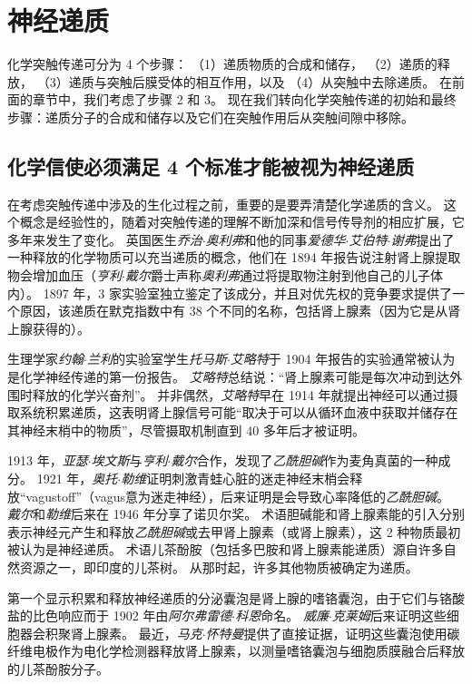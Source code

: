\chapter{神经递质} \label{chap:chap16}

化学突触传递可分为 4 个步骤：
（1）递质物质的合成和储存，
（2）递质的释放，
（3）递质与突触后膜受体的相互作用，以及
（4）从突触中去除递质。
在前面的章节中，我们考虑了步骤 2 和 3。
现在我们转向化学突触传递的初始和最终步骤：递质分子的合成和储存以及它们在突触作用后从突触间隙中移除。



\section{化学信使必须满足 4 个标准才能被视为神经递质}

在考虑突触传递中涉及的生化过程之前，重要的是要弄清楚化学递质的含义。
这个概念是经验性的，随着对突触传递的理解不断加深和信号传导剂的相应扩展，它多年来发生了变化。
英国医生\textit{乔治$\cdot$奥利弗}和他的同事\textit{爱德华$\cdot$艾伯特$\cdot$谢弗}提出了一种释放的化学物质可以充当递质的概念，他们在 1894 年报告说注射肾上腺提取物会增加血压（\textit{亨利$\cdot$戴尔}爵士声称\textit{奥利弗}通过将提取物注射到他自己的儿子体内）。
1897 年，3 家实验室独立鉴定了该成分，并且对优先权的竞争要求提供了一个原因，该递质在默克指数中有 38 个不同的名称，包括肾上腺素（因为它是从肾上腺获得的）。


生理学家\textit{约翰$\cdot$兰利}的实验室学生\textit{托马斯$\cdot$艾略特}于 1904 年报告的实验通常被认为是化学神经传递的第一份报告。
\textit{艾略特}总结说：“肾上腺素可能是每次冲动到达外围时释放的化学兴奋剂”。
并非偶然，\textit{艾略特}早在 1914 年就提出神经可以通过摄取系统积累递质，这表明肾上腺信号可能“取决于可以从循环血液中获取并储存在其神经末梢中的物质”，尽管摄取机制直到 40 多年后才被证明。


1913 年，\textit{亚瑟$\cdot$埃文斯}与\textit{亨利$\cdot$戴尔}合作，发现了\textit{乙酰胆碱}作为麦角真菌的一种成分。
1921 年，\textit{奥托$\cdot$勒维}证明刺激青蛙心脏的迷走神经末梢会释放“vagustoff”（vagus意为迷走神经），后来证明是会导致心率降低的\textit{乙酰胆碱}。
\textit{戴尔}和\textit{勒维}后来在 1946 年分享了诺贝尔奖。
术语胆碱能和肾上腺素能的引入分别表示神经元产生和释放\textit{乙酰胆碱}或去甲肾上腺素（或肾上腺素），这 2 种物质最初被认为是神经递质。
术语儿茶酚胺（包括多巴胺和肾上腺素能递质）源自许多自然资源之一，即印度的儿茶树。
从那时起，许多其他物质被确定为递质。


第一个显示积累和释放神经递质的分泌囊泡是肾上腺的嗜铬囊泡，由于它们与铬酸盐的比色响应而于 1902 年由\textit{阿尔弗雷德$\cdot$科恩}命名。
\textit{威廉$\cdot$克莱姆}后来证明这些细胞器会积聚肾上腺素。
最近，\textit{马克$\cdot$怀特曼}提供了直接证据，证明这些囊泡使用碳纤维电极作为电化学检测器释放肾上腺素，以测量嗜铬囊泡与细胞质膜融合后释放的儿茶酚胺分子。


